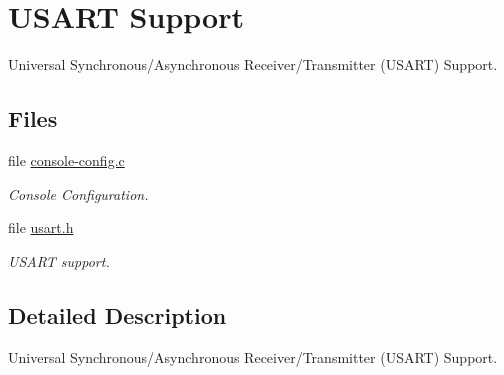 \hypertarget{group__raspberrypi__usart}{}\section{U\+S\+A\+RT Support}
\label{group__raspberrypi__usart}


Universal Synchronous/\+Asynchronous Receiver/\+Transmitter (U\+S\+A\+RT) Support.  


\subsection*{Files}
\begin{DoxyCompactItemize}
\item 
file \mbox{\hyperlink{arm_2raspberrypi_2console_2console-config_8c}{console-\/config.\+c}}
\begin{DoxyCompactList}\small\item\em Console Configuration. \end{DoxyCompactList}\item 
file \mbox{\hyperlink{raspberrypi_2include_2bsp_2usart_8h}{usart.\+h}}
\begin{DoxyCompactList}\small\item\em U\+S\+A\+RT support. \end{DoxyCompactList}\end{DoxyCompactItemize}


\subsection{Detailed Description}
Universal Synchronous/\+Asynchronous Receiver/\+Transmitter (U\+S\+A\+RT) Support. 

